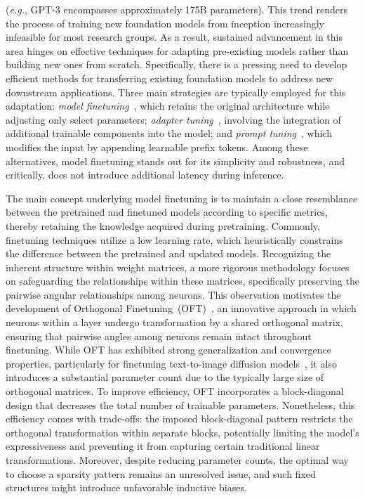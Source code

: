 (\emph{e.g.}, GPT-3 encompasses approximately 175B parameters). This trend renders the process of training new foundation models from inception increasingly infeasible for most research groups. As a result, sustained advancement in this area hinges on effective techniques for adapting pre-existing models rather than building new ones from scratch. Specifically, there is a pressing need to develop efficient methods for transferring existing foundation models to address new downstream applications. Three main strategies are typically employed for this adaptation: \emph{model finetuning}~\cite{hulora2022,zaken2022bitfit,guo2020parameter,raffel2020exploring,qiu2023controlling,zhang2022adaptive,chavan2023one}, which retains the original architecture while adjusting only select parameters; \emph{adapter tuning}~\cite{rebuffi2017learning,houlsby2019parameter,pfeiffer2020adapterfusion,lin2020exploring,he2021towards}, involving the integration of additional trainable components into the model; and \emph{prompt tuning}~\cite{li2021prefix,lester2021power}, which modifies the input by appending learnable prefix tokens. Among these alternatives, model finetuning stands out for its simplicity and robustness, and critically, does not introduce additional latency during inference.

The main concept underlying model finetuning is to maintain a close resemblance between the pretrained and finetuned models according to specific metrics, thereby retaining the knowledge acquired during pretraining. Commonly, finetuning techniques utilize a low learning rate, which heuristically constrains the difference between the pretrained and updated models. Recognizing the inherent structure within weight matrices, a more rigorous methodology focuses on safeguarding the relationships within these matrices, specifically preserving the pairwise angular relationships among neurons. This observation motivates the development of Orthogonal Finetuning~(OFT)~\cite{qiu2023controlling}, an innovative approach in which neurons within a layer undergo transformation by a shared orthogonal matrix, ensuring that pairwise angles among neurons remain intact throughout finetuning. While OFT has exhibited strong generalization and convergence properties, particularly for finetuning text-to-image diffusion models~\cite{qiu2023controlling}, it also introduces a substantial parameter count due to the typically large size of orthogonal matrices. To improve efficiency, OFT incorporates a block-diagonal design that decreases the total number of trainable parameters. Nonetheless, this efficiency comes with trade-offs: the imposed block-diagonal pattern restricts the orthogonal transformation within separate blocks, potentially limiting the model’s expressiveness and preventing it from capturing certain traditional linear transformations. Moreover, despite reducing parameter counts, the optimal way to choose a sparsity pattern remains an unresolved issue, and such fixed structures might introduce unfavorable inductive biases.

